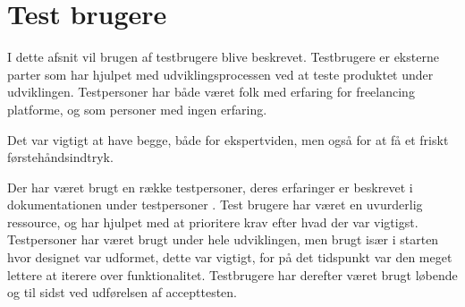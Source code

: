 \chapter{Test brugere}

I dette afsnit vil brugen af testbrugere blive beskrevet. Testbrugere er eksterne parter som har hjulpet med udviklingsprocessen ved at teste produktet under udviklingen. Testpersoner har både været folk med erfaring for freelancing platforme, og som personer med ingen erfaring.

Det var vigtigt at have begge, både for ekspertviden, men også for at få et friskt førstehåndsindtryk.

Der har været brugt en række testpersoner, deres erfaringer er beskrevet i dokumentationen under testpersoner . Test brugere har været en uvurderlig ressource, og har hjulpet med at prioritere krav efter hvad der var vigtigst. Testpersoner har været brugt under hele udviklingen, men brugt især i starten hvor designet var udformet, dette var vigtigt, for på det tidspunkt var den meget lettere at iterere over funktionalitet. Testbrugere har derefter været brugt løbende og til sidst ved udførelsen af accepttesten.